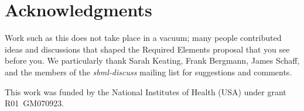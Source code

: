 
\section{Acknowledgments}

Work such as this does not take place in a vacuum; many people contributed ideas and discussions that shaped the Required Elements proposal that you see before you.  We particularly thank Sarah Keating, Frank Bergmann, James Schaff, and the members of the \emph{sbml-discuss} mailing list for suggestions and comments.

This work was funded by the National Institutes of Health (USA) under grant R01~GM070923.
